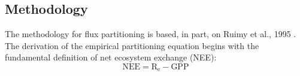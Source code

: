 \subsection{Methodology}
\label{sec:mst1meth}
The methodology for flux partitioning is based, in part, on Ruimy et al., 1995 \parencite{ruimy95}.  
The derivation of the empirical partitioning equation begins with the fundamental definition of net ecosystem exchange (NEE)\parencite{lovett06}:
%
%
%
\begin{equation}
\label{eq:nee}
    \text{NEE} = \text{R}_{\text{e}} - \text{GPP}
\end{equation}

